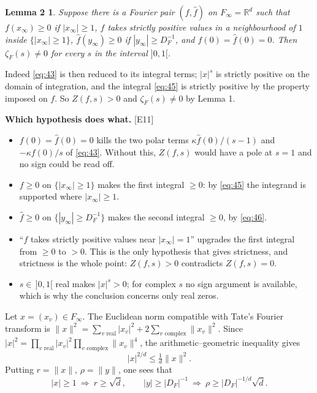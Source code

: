 \documentclass[11pt,reqno]{amsart}
\theoremstyle{plain}
\newtheorem*{lemB}{Lemma 2}
\theoremstyle{definition}
\theoremstyle{remark}
\newcommand{\R}{\mathbb{R}}
\newcommand{\fh}{\widehat{f}}
\newcommand{\Ledger}[1]{{\scriptsize\textsf{[#1]}}}
\begin{document}
\begin{lemB}
Suppose there is a Fourier pair $(f,\fh)$ on $F_\infty=\R^d$ such that
$f(x_\infty)\ge0$ if $|x_\infty|\ge1$, $f$ takes strictly positive values in a
neighbourhood of $1$ inside $\{|x_\infty|\ge1\}$, $\fh(y_\infty)\ge0$ if
$|y_\infty|\ge D_F^{-1}$, and $f(0)=\fh(0)=0$. Then $\zeta_F(s)\ne0$ for every $s$ in
the interval $]0,1[$.
\end{lemB}

Indeed \eqref{eq:43} is then reduced to its integral terms; $|x|^s$ is strictly
positive on the domain of integration, and the integral \eqref{eq:45} is strictly
positive by the property imposed on $f$. So $Z(f,s)>0$ and $\zeta_F(s)\ne0$ by
Lemma 1.

\begin{expansion}
\textbf{Which hypothesis does what.} \Ledger{E11}
\begin{itemize}[leftmargin=1.4em,itemsep=2pt]
\item $f(0)=\fh(0)=0$ kills the two polar terms $\kappa\fh(0)/(s-1)$ and
  $-\kappa f(0)/s$ of \eqref{eq:43}. Without this, $Z(f,s)$ would have a pole at
  $s=1$ and no sign could be read off.
\item $f\ge0$ on $\{|x_\infty|\ge1\}$ makes the first integral $\ge0$: by
  \eqref{eq:45} the integrand is supported where $|x_\infty|\ge1$.
\item $\fh\ge0$ on $\{|y_\infty|\ge D_F^{-1}\}$ makes the second integral $\ge0$, by
  \eqref{eq:46}.
\item ``$f$ takes strictly positive values near $|x_\infty|=1$'' upgrades the first
  integral from $\ge0$ to $>0$. This is the only hypothesis that gives strictness,
  and strictness is the whole point: $Z(f,s)>0$ contradicts $Z(f,s)=0$.
\item $s\in\,]0,1[$ real makes $|x|^s>0$; for complex $s$ no sign argument is
  available, which is why the conclusion concerns only real zeros.
\end{itemize}
\end{expansion}

Let $x=(x_v)\in F_\infty$. The Euclidean norm compatible with Tate's Fourier
transform is $\|x\|^2=\sum_{v\text{ real}}|x_v|^2+2\sum_{v\text{ complex}}\|x_v\|^2$.
Since $|x|^2=\prod_{v\text{ real}}|x_v|^2\prod_{v\text{ complex}}\|x_v\|^4$, the
arithmetic--geometric inequality gives
\[|x|^{2/d}\le\tfrac1d\|x\|^2 .\]
Putting $r=\|x\|$, $\rho=\|y\|$, one sees that
\[|x|\ge1\ \Longrightarrow\ r\ge\sqrt d,\qquad
  |y|\ge|D_F|^{-1}\ \Longrightarrow\ \rho\ge|D_F|^{-1/d}\sqrt d .\]
\end{document}
